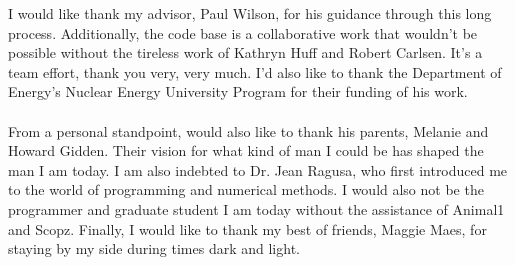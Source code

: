 

I would like thank my advisor, Paul Wilson, for his guidance through this long
process. Additionally, the \Cyclus code base is a collaborative work that
wouldn't be possible without the tireless work of Kathryn Huff and Robert
Carlsen. It's a team effort, thank you very, very much. I'd also like to thank
the Department of Energy's Nuclear Energy University Program for their funding
of his work.
\\ \\
From a personal standpoint, would also like to thank his parents, Melanie and
Howard Gidden. Their vision for what kind of man I could be has shaped the man I
am today. I am also indebted to Dr. Jean Ragusa, who first introduced me to the
world of programming and numerical methods. I would also not be the programmer
and graduate student I am today without the assistance of Animal1 and
Scopz. Finally, I would like to thank my best of friends, Maggie Maes, for
staying by my side during times dark and light.

